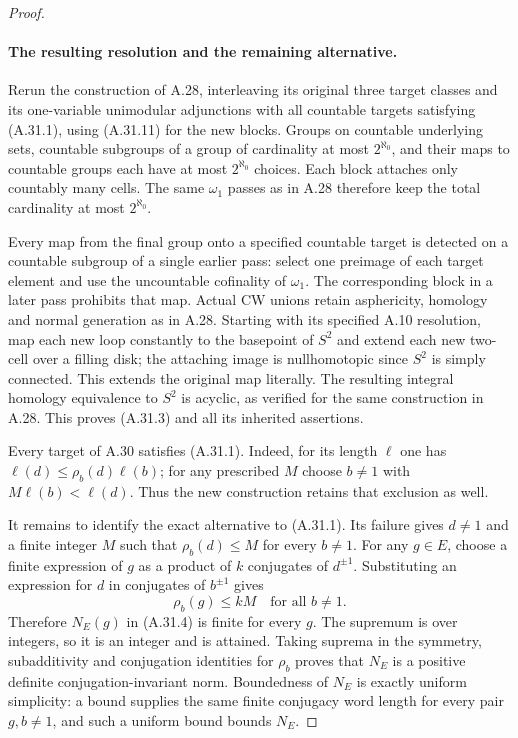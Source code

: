 \begin{proof}
\paragraph{The resulting resolution and the remaining alternative.}
Rerun the construction of A.28, interleaving its original
three target classes and its one-variable unimodular
adjunctions with all countable targets satisfying
(A.31.1), using (A.31.11) for the new blocks. Groups on
countable underlying sets, countable subgroups of a group
of cardinality at most $2^{\aleph_0}$, and their maps to
countable groups each have at most $2^{\aleph_0}$ choices.
Each block attaches only countably many cells. The same
$\omega_1$ passes as in A.28 therefore keep the total
cardinality at most $2^{\aleph_0}$.

Every map from the final group onto a specified countable
target is detected on a countable subgroup of a single
earlier pass: select one preimage of each target element
and use the uncountable cofinality of $\omega_1$. The
corresponding block in a later pass prohibits that map.
Actual CW unions retain asphericity, homology and normal
generation as in A.28. Starting with its specified A.10
resolution, map each new loop constantly to the basepoint
of $S^2$ and extend each new two-cell over a filling disk;
the attaching image is nullhomotopic since $S^2$ is simply
connected. This extends the original map literally.
The resulting integral homology equivalence to $S^2$ is
acyclic, as verified for the same construction in A.28.
This proves (A.31.3) and all its inherited assertions.

Every target of A.30 satisfies (A.31.1). Indeed, for its
length $\ell$ one has
$\ell(d)\leq\rho_b(d)\ell(b)$; for any prescribed $M$
choose $b\ne1$ with $M\ell(b)<\ell(d)$. Thus the new
construction retains that exclusion as well.

It remains to identify the exact alternative to
(A.31.1). Its failure gives $d\ne1$ and a finite integer
$M$ such that $\rho_b(d)\leq M$ for every $b\ne1$.
For any $g\in E$, choose a finite expression of $g$ as a
product of $k$ conjugates of $d^{\pm1}$. Substituting an
expression for $d$ in conjugates of $b^{\pm1}$ gives
\[
 \rho_b(g)\leq kM\quad\text{for all }b\ne1.
 \tag{A.31.13}
\]
Therefore $N_E(g)$ in (A.31.4) is finite for every $g$.
The supremum is over integers, so it is an integer and is
attained. Taking suprema in the symmetry, subadditivity
and conjugation identities for $\rho_b$ proves that
$N_E$ is a positive definite conjugation-invariant norm.
Boundedness of $N_E$ is exactly uniform simplicity: a
bound supplies the same finite conjugacy word length for
every pair $g,b\ne1$, and such a uniform bound bounds
$N_E$.


\end{proof}
